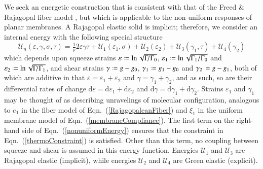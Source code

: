We seek an energetic construction that is consistent with that of the Freed \& Rajagopal fiber model \cite{FreedRajagopal16}, but which is applicable to the non-uniform responses of planar membranes.  A Rajagopal elastic solid is implicit; therefore, we consider an internal energy with the following special structure
\begin{equation}
\mathcal{U}_n ( \varepsilon , \gamma , \sigma , \tau ) = \tfrac{1}{\rho} 2 \varepsilon \gamma \tau + \mathcal{U}_1 ( \varepsilon_1 , \sigma ) + \mathcal{U}_2 ( \varepsilon_2 ) + \mathcal{U}_3 ( \gamma_1 , \tau ) + \mathcal{U}_4 ( \gamma_2 )
\label{nonuniformEnergy}
\end{equation}
which depends upon squeeze strains $\varepsilon \defeq \ln \sqrt{\Gamma \! / \Gamma_0}$, $\varepsilon_1 \defeq \ln \sqrt{ \Gamma_1 / \Gamma_0}$ and $\varepsilon_2 \defeq \ln \sqrt{ \Gamma \! / \Gamma_1}$, and shear strains $\gamma \defeq g - g_0$, $\gamma_1 \defeq g_1 - g_0$ and $\gamma_2 \defeq g - g_1$, both of which are additive in that $\varepsilon = \varepsilon_1 + \varepsilon_2$ and $\gamma = \gamma_1 + \gamma_2$, and as such, so are their differential rates of change $\mathrm{d} \varepsilon = \mathrm{d} \varepsilon_1 + \mathrm{d} \varepsilon_2$ and $\mathrm{d} \gamma = \mathrm{d} \gamma_1 + \mathrm{d} \gamma_2$.  Strains $\varepsilon_1$ and $\gamma_1$ may be thought of as describing unravelings of molecular configuration, analogous to $e_1$ in the fiber model of Eqn.~(\ref{RajagopaleanFiber}) and $\xi_1$ in the uniform membrane model of Eqn.~(\ref{membraneCompliance}).  The first term on the right-hand side of Eqn.~(\ref{nonuniformEnergy}) ensures that the constraint in Eqn.~(\ref{thermoConstraint}) is satisfied.  Other than this term, no coupling between squeeze and shear is assumed in this energy function.  Energies $\mathcal{U}_1$ and $\mathcal{U}_3$ are Rajagopal elastic (implicit), while energies $\mathcal{U}_2$ and $\mathcal{U}_4$ are Green elastic (explicit).

